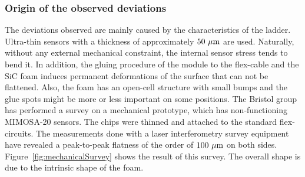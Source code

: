       \subsubsection{Origin of the observed deviations}

      The deviations observed are mainly caused by the characteristics of the ladder.
      Ultra-thin sensors with a thickness of approximately $50~\rm{\mu m}$ are used.
      Naturally, without any external mechanical constraint, the internal sensor stress tends to bend it.
      In addition, the gluing procedure of the module to the flex-cable and the \gls{SiC} foam induces permanent deformations of the surface that can not be flattened.
      Also, the foam has an open-cell structure with small bumps and the glue spots might be more or less important on some positions.
      The Bristol group has performed a survey on a mechanical prototype, which has non-functioning \gls{MIMOSA}-20 sensors.
      The chips were thinned and attached to the standard flex-circuits.
      The measurements done with a laser interferometry survey equipment have revealed a peak-to-peak flatness of the order of $100~\rm{\mu m}$ on both sides.
      Figure~\ref{fig:mechanicalSurvey} shows the result of this survey.
      The overall shape is due to the intrinsic shape of the foam.
       
